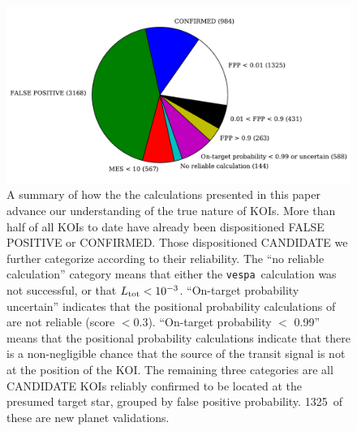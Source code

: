 \documentclass{emulateapj}
\newcommand{\figlabel}[1]{\label{fig:#1}}
\newcommand{\nvalnew}{1325} %
\newcommand{\nfpnew}{424}  %
\newcommand{\posprobthresh}{0.3}
\newcommand{\vespa}{\texttt{vespa}}
\begin{document}
\begin{figure}[p]
\begin{center}
\includegraphics[width=7in]{figures/fpp_pie.pdf}
\end{center}
\caption{A summary of how the the calculations presented in this paper
  advance our understanding of the true nature of KOIs.  More than
  half of all KOIs to date have already been dispositioned FALSE
  POSITIVE or CONFIRMED.  Those dispositioned CANDIDATE we further
  categorize according to their reliability.  The ``no reliable
  calculation'' category means that either the \vespa\ calculation was
  not successful, or that $L_{\rm tot} < 10^{-3}$.  ``On-target
  probability uncertain'' indicates that the positional probability
  calculations of \citet{Bryson:KSCI} are not reliable (score $<
  \posprobthresh$).  ``On-target probability $<$ 0.99'' means that the positional
  probability calculations indicate that there is a non-negligible
  chance that the source of the transit signal is not at the position
  of the KOI.  The remaining three categories are all CANDIDATE KOIs
  reliably confirmed to be located at the presumed target star,
  grouped by false positive probability.  \nvalnew\ of these are new
  planet validations.%
  \figlabel{fpppie}}
\end{figure}
\end{document}
